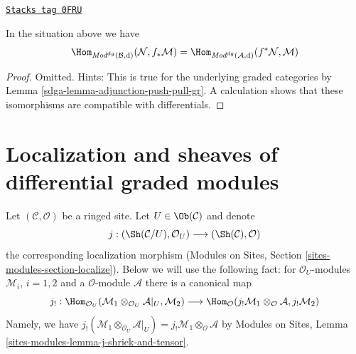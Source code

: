 \begin{lemma}
\label{sdga-lemma-adjunction-push-pull-dg}
\href{https://stacks.math.columbia.edu/tag/0FRU}{\texttt{Stacks tag 0FRU}}

In the situation above we have
$$
\Hom_{\textit{Mod}^{dg}(\mathcal{B}, \text{d})}(
\mathcal{N}, f_*\mathcal{M}) =
\Hom_{\textit{Mod}^{dg}(\mathcal{A}, \text{d})}(
f^*\mathcal{N}, \mathcal{M})
$$
\end{lemma}

\begin{proof}

Omitted. Hints: This is true for the underlying graded categories
by Lemma \ref{sdga-lemma-adjunction-push-pull-gr}. A calculation shows
that these isomorphisms are compatible with differentials.
\end{proof}

\section{Localization and sheaves of differential graded modules}
\label{sdga-section-localize-dg}
Let $(\mathcal{C}, \mathcal{O})$ be a ringed site.
Let $U \in \Ob(\mathcal{C})$ and denote
$$
j :
(\Sh(\mathcal{C}/U), \mathcal{O}_U)
\longrightarrow
(\Sh(\mathcal{C}), \mathcal{O})
$$
the corresponding localization morphism
(Modules on Sites, Section \ref{sites-modules-section-localize}).
Below we will use the following fact: for $\mathcal{O}_U$-modules
$\mathcal{M}_i$, $i = 1, 2$ and a $\mathcal{O}$-module $\mathcal{A}$
there is a canonical map
$$
j_! :
\Hom_{\mathcal{O}_U}(
\mathcal{M}_1 \otimes_{\mathcal{O}_U} \mathcal{A}|_U, \mathcal{M}_2)
\longrightarrow
\Hom_\mathcal{O}(
j_!\mathcal{M}_1 \otimes_\mathcal{O} \mathcal{A}, j_!\mathcal{M}_2)
$$
Namely, we have
$j_!(\mathcal{M}_1 \otimes_{\mathcal{O}_U} \mathcal{A}|_U) =
j_!\mathcal{M}_1 \otimes_\mathcal{O} \mathcal{A}$ by
Modules on Sites, Lemma \ref{sites-modules-lemma-j-shriek-and-tensor}.

